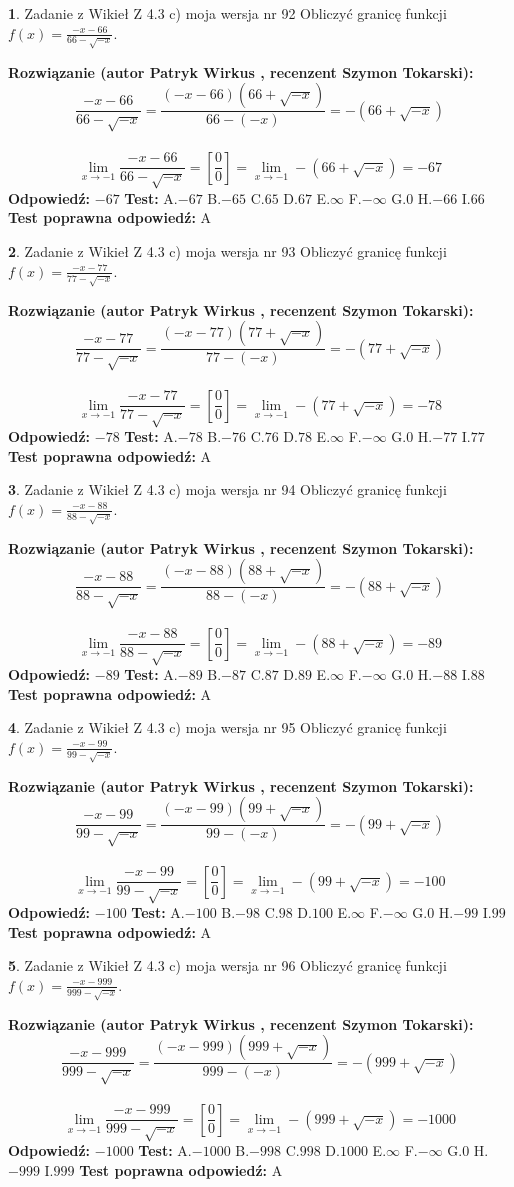 \documentclass[12pt, a4paper]{article}
\theoremstyle{definition} %
\newtheorem{zad}{}
\newcommand{\zadStart}[1]{\begin{zad}#1\newline}
\newcommand{\zadStop}{\end{zad}}
\newcommand{\rozwStart}[2]{\noindent \textbf{Rozwiązanie (autor #1 , recenzent #2): }\newline}
\newcommand{\rozwStop}{\newline}
\newcommand{\odpStart}{\noindent \textbf{Odpowiedź:}\newline}
\newcommand{\odpStop}{\newline}
\newcommand{\testStart}{\noindent \textbf{Test:}\newline}
\newcommand{\testStop}{\newline}
\newcommand{\kluczStart}{\noindent \textbf{Test poprawna odpowiedź:}\newline}
\newcommand{\kluczStop}{\newline}
\begin{document}
\zadStart{Zadanie z Wikieł Z 4.3 c) moja wersja nr 92}
Obliczyć granicę funkcji $f(x)=\frac{-x-66}{66-\sqrt{-x}}$.
\zadStop
\rozwStart{Patryk Wirkus}{Szymon Tokarski}
$$\frac{-x-66}{66-\sqrt{-x}}=\frac{(-x-66)(66+\sqrt{-x})}{66-(-x)}=-(66+\sqrt{-x})$$
\\
$$\lim\limits_{x\to-1}\frac{-x-66}{66-\sqrt{-x}}=[\frac{0}{0}]=\lim\limits_{x\to-1}-(66+\sqrt{-x}) =-67$$
\rozwStop
\odpStart
$-67$
\odpStop
\testStart
A.$-67$
B.$-65$
C.$65$
D.$67$
E.$\infty$
F.$-\infty$
G.$0$
H.$-66$
I.$66$
\testStop
\kluczStart
A
\kluczStop



\zadStart{Zadanie z Wikieł Z 4.3 c) moja wersja nr 93}
Obliczyć granicę funkcji $f(x)=\frac{-x-77}{77-\sqrt{-x}}$.
\zadStop
\rozwStart{Patryk Wirkus}{Szymon Tokarski}
$$\frac{-x-77}{77-\sqrt{-x}}=\frac{(-x-77)(77+\sqrt{-x})}{77-(-x)}=-(77+\sqrt{-x})$$
\\
$$\lim\limits_{x\to-1}\frac{-x-77}{77-\sqrt{-x}}=[\frac{0}{0}]=\lim\limits_{x\to-1}-(77+\sqrt{-x}) =-78$$
\rozwStop
\odpStart
$-78$
\odpStop
\testStart
A.$-78$
B.$-76$
C.$76$
D.$78$
E.$\infty$
F.$-\infty$
G.$0$
H.$-77$
I.$77$
\testStop
\kluczStart
A
\kluczStop



\zadStart{Zadanie z Wikieł Z 4.3 c) moja wersja nr 94}
Obliczyć granicę funkcji $f(x)=\frac{-x-88}{88-\sqrt{-x}}$.
\zadStop
\rozwStart{Patryk Wirkus}{Szymon Tokarski}
$$\frac{-x-88}{88-\sqrt{-x}}=\frac{(-x-88)(88+\sqrt{-x})}{88-(-x)}=-(88+\sqrt{-x})$$
\\
$$\lim\limits_{x\to-1}\frac{-x-88}{88-\sqrt{-x}}=[\frac{0}{0}]=\lim\limits_{x\to-1}-(88+\sqrt{-x}) =-89$$
\rozwStop
\odpStart
$-89$
\odpStop
\testStart
A.$-89$
B.$-87$
C.$87$
D.$89$
E.$\infty$
F.$-\infty$
G.$0$
H.$-88$
I.$88$
\testStop
\kluczStart
A
\kluczStop



\zadStart{Zadanie z Wikieł Z 4.3 c) moja wersja nr 95}
Obliczyć granicę funkcji $f(x)=\frac{-x-99}{99-\sqrt{-x}}$.
\zadStop
\rozwStart{Patryk Wirkus}{Szymon Tokarski}
$$\frac{-x-99}{99-\sqrt{-x}}=\frac{(-x-99)(99+\sqrt{-x})}{99-(-x)}=-(99+\sqrt{-x})$$
\\
$$\lim\limits_{x\to-1}\frac{-x-99}{99-\sqrt{-x}}=[\frac{0}{0}]=\lim\limits_{x\to-1}-(99+\sqrt{-x}) =-100$$
\rozwStop
\odpStart
$-100$
\odpStop
\testStart
A.$-100$
B.$-98$
C.$98$
D.$100$
E.$\infty$
F.$-\infty$
G.$0$
H.$-99$
I.$99$
\testStop
\kluczStart
A
\kluczStop



\zadStart{Zadanie z Wikieł Z 4.3 c) moja wersja nr 96}
Obliczyć granicę funkcji $f(x)=\frac{-x-999}{999-\sqrt{-x}}$.
\zadStop
\rozwStart{Patryk Wirkus}{Szymon Tokarski}
$$\frac{-x-999}{999-\sqrt{-x}}=\frac{(-x-999)(999+\sqrt{-x})}{999-(-x)}=-(999+\sqrt{-x})$$
\\
$$\lim\limits_{x\to-1}\frac{-x-999}{999-\sqrt{-x}}=[\frac{0}{0}]=\lim\limits_{x\to-1}-(999+\sqrt{-x}) =-1000$$
\rozwStop
\odpStart
$-1000$
\odpStop
\testStart
A.$-1000$
B.$-998$
C.$998$
D.$1000$
E.$\infty$
F.$-\infty$
G.$0$
H.$-999$
I.$999$
\testStop
\kluczStart
A
\kluczStop
\end{document}
